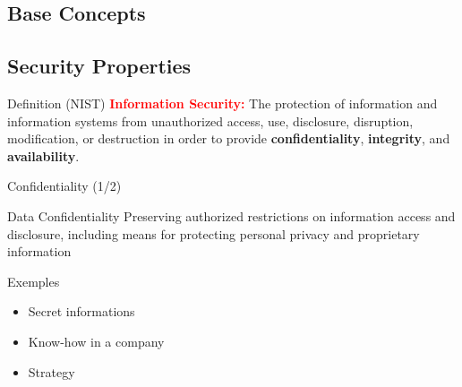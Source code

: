 


\begin{reveals}
                
\maketitle




\section{Base Concepts}

\subsection{Security Properties}

\begin{frame}[c]{}
  
  \begin{block}{Definition (NIST)}
    \textcolor{red}{\bf Information Security:} The protection of
    information and information systems from unauthorized access, use,
    disclosure, disruption, modification, or destruction in order to
    provide \textbf{confidentiality}, \textbf{integrity}, and
    \textbf{availability}.
  \end{block}
\end{frame}

\begin{frame}[c]{Confidentiality (1/2)}
  
  \begin{block}{Data Confidentiality}
    Preserving authorized restrictions on information access and
    disclosure, including means for protecting personal privacy and
    proprietary information
  \end{block}

  \vfill

  \begin{block}{Exemples}
    \begin{itemize}
    \item Secret informations
    \item Know-how in a company
    \item Strategy
    \end{itemize}
  \end{block}
\end{frame}


\end{reveals}
